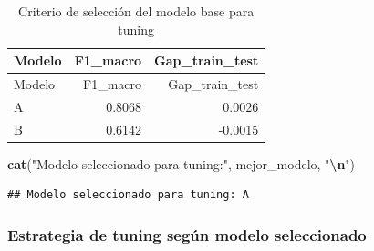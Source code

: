\documentclass[
]{article}
\newenvironment{Shaded}{\begin{snugshade}}{\end{snugshade}}
\newcommand{\FunctionTok}[1]{\textcolor[rgb]{0.13,0.29,0.53}{\textbf{#1}}}
\newcommand{\NormalTok}[1]{#1}
\newcommand{\SpecialCharTok}[1]{\textcolor[rgb]{0.81,0.36,0.00}{\textbf{#1}}}
\newcommand{\StringTok}[1]{\textcolor[rgb]{0.31,0.60,0.02}{#1}}
\begin{document}
\begin{longtable}[]{@{}lrr@{}}
\caption{Criterio de selección del modelo base para
tuning}\tabularnewline
\toprule\noalign{}
Modelo & F1\_macro & Gap\_train\_test \\
\midrule\noalign{}
\endfirsthead
\toprule\noalign{}
Modelo & F1\_macro & Gap\_train\_test \\
\midrule\noalign{}
\endhead
\bottomrule\noalign{}
\endlastfoot
A & 0.8068 & 0.0026 \\
B & 0.6142 & -0.0015 \\
\end{longtable}

\begin{Shaded}
\begin{Highlighting}[]
\FunctionTok{cat}\NormalTok{(}\StringTok{"Modelo seleccionado para tuning:"}\NormalTok{, mejor\_modelo, }\StringTok{"}\SpecialCharTok{\textbackslash{}n}\StringTok{"}\NormalTok{)}
\end{Highlighting}
\end{Shaded}

\begin{verbatim}
## Modelo seleccionado para tuning: A
\end{verbatim}

\hypertarget{estrategia-de-tuning-seguxfan-modelo-seleccionado}{%
\subsubsection{Estrategia de tuning según modelo
seleccionado}\label{estrategia-de-tuning-seguxfan-modelo-seleccionado}}
\end{document}
